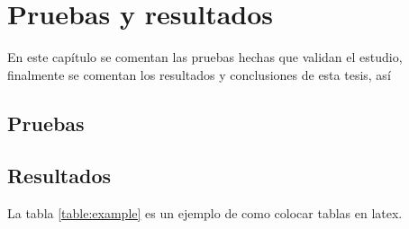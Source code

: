 \chapter{Pruebas y resultados}
\label{chap:cha5}
En este capítulo se comentan las pruebas hechas que validan el estudio, finalmente se comentan los resultados y conclusiones de esta tesis, así 

\section{Pruebas}

\section{Resultados}


La tabla \ref{table:example} es un ejemplo de como colocar tablas en latex.

\begin{table}[h]
\centering
{}
	\caption[Resultados con método propuesto.]{Porcentage de error obtenido.}
	\label{table:example}
\end{table}


